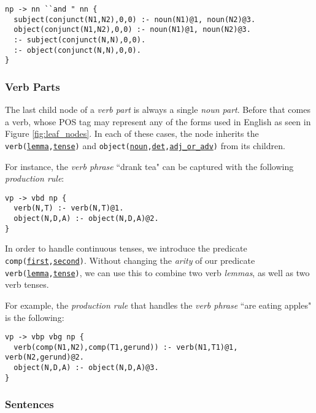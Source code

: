 \begin{displayquote}
\begin{lstlisting}
np -> nn ``and " nn {
  subject(conjunct(N1,N2),0,0) :- noun(N1)@1, noun(N2)@3.
  object(conjunct(N1,N2),0,0) :- noun(N1)@1, noun(N2)@3.
  :- subject(conjunct(N,N),0,0).
  :- object(conjunct(N,N),0,0).
}
\end{lstlisting}
\end{displayquote}

\subsubsection*{Verb Parts}

The last child node of a \textit{verb part} is always a single \textit{noun part}. Before that comes a verb, whose POS tag may represent any of the forms used in English as seen in Figure \ref{fig:leaf_nodes}. In each of these cases, the node inherits the \texttt{verb(\underline{lemma},\underline{tense})} and \texttt{object(\underline{noun},\underline{det},\underline{adj\_or\_adv})} from its children.

For instance, the \textit{verb phrase} ``drank tea" can be captured with the following \textit{production rule}:

\begin{displayquote}
\begin{lstlisting}
vp -> vbd np {
  verb(N,T) :- verb(N,T)@1.
  object(N,D,A) :- object(N,D,A)@2.
}
\end{lstlisting}
\end{displayquote}

\noindent
In order to handle continuous tenses, we introduce the predicate \texttt{comp(\underline{first},\underline{second})}. Without changing the \textit{arity} of our predicate \texttt{verb(\underline{lemma},\underline{tense})}, we can use this to combine two verb \textit{lemmas}, as well as two verb tenses.

For example, the \textit{production rule} that handles the \textit{verb phrase} ``are eating apples" is the following:

\begin{displayquote}
\begin{lstlisting}
vp -> vbp vbg np {
  verb(comp(N1,N2),comp(T1,gerund)) :- verb(N1,T1)@1, verb(N2,gerund)@2.
  object(N,D,A) :- object(N,D,A)@3.
}
\end{lstlisting}
\end{displayquote}

\subsubsection*{Sentences}

